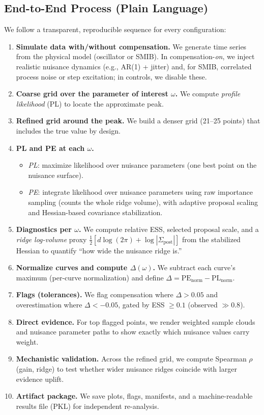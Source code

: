 \documentclass[conference]{IEEEtran}
\begin{document}
\subsection{End-to-End Process (Plain Language)}
\label{subsec:plain}
We follow a transparent, reproducible sequence for every configuration:
\begin{enumerate}
\item \textbf{Simulate data with/without compensation.} We generate time series from the physical model (oscillator or SMIB). In compensation-\emph{on}, we inject realistic nuisance dynamics (e.g., AR(1) + jitter) and, for SMIB, correlated process noise or step excitation; in controls, we disable these.
\item \textbf{Coarse grid over the parameter of interest $\omega$.} We compute \emph{profile likelihood} (PL) to locate the approximate peak.
\item \textbf{Refined grid around the peak.} We build a denser grid (21–25 points) that includes the true value by design.
\item \textbf{PL and PE at each $\omega$.}
  \begin{itemize}
  \item \emph{PL}: maximize likelihood over nuisance parameters (one best point on the nuisance surface).
  \item \emph{PE}: integrate likelihood over nuisance parameters using raw importance sampling (counts the whole ridge volume), with adaptive proposal scaling and Hessian-based covariance stabilization.
  \end{itemize}
\item \textbf{Diagnostics per $\omega$.} We compute relative ESS, selected proposal scale, and a \emph{ridge log-volume} proxy $\tfrac{1}{2}[d\log(2\pi)+\log|\Sigma_{\text{post}}|]$ from the stabilized Hessian to quantify “how wide the nuisance ridge is.”
\item \textbf{Normalize curves and compute $\Delta(\omega)$.} We subtract each curve’s maximum (per-curve normalization) and define $\Delta=\mathrm{PE}_{\text{norm}}-\mathrm{PL}_{\text{norm}}$.
\item \textbf{Flags (tolerances).} We flag compensation where $\Delta>0.05$ and overestimation where $\Delta<-0.05$, gated by ESS $\ge 0.1$ (observed $\gg 0.8$).
\item \textbf{Direct evidence.} For top flagged points, we render weighted sample clouds and nuisance parameter paths to show exactly which nuisance values carry weight.
\item \textbf{Mechanistic validation.} Across the refined grid, we compute Spearman $\rho$(gain, ridge) to test whether wider nuisance ridges coincide with larger evidence uplift.
\item \textbf{Artifact package.} We save plots, flags, manifests, and a machine-readable results file (PKL) for independent re-analysis.
\end{enumerate}

\balance
\end{document}
